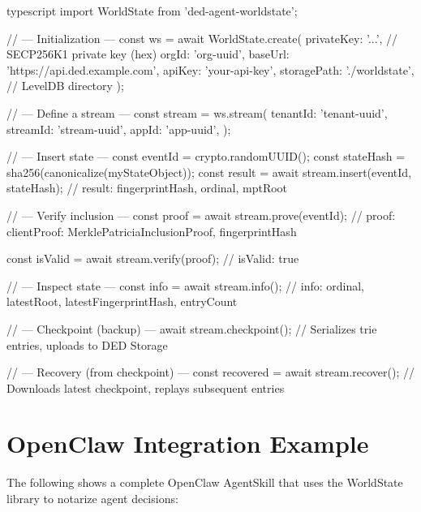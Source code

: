 \documentclass[11pt,a4paper]{article}
\begin{document}
\begin{codebox}{typescript}
import { WorldState } from 'ded-agent-worldstate';

// --- Initialization ---
const ws = await WorldState.create({
  privateKey: '...',           // SECP256K1 private key (hex)
  orgId: 'org-uuid',
  baseUrl: 'https://api.ded.example.com',
  apiKey: 'your-api-key',
  storagePath: './worldstate', // LevelDB directory
});

// --- Define a stream ---
const stream = ws.stream({
  tenantId: 'tenant-uuid',
  streamId: 'stream-uuid',
  appId: 'app-uuid',
});

// --- Insert state ---
const eventId = crypto.randomUUID();
const stateHash = sha256(canonicalize(myStateObject));
const result = await stream.insert(eventId, stateHash);
// result: { fingerprintHash, ordinal, mptRoot }

// --- Verify inclusion ---
const proof = await stream.prove(eventId);
// proof: { clientProof: MerklePatriciaInclusionProof, fingerprintHash }

const isValid = await stream.verify(proof);
// isValid: true

// --- Inspect state ---
const info = await stream.info();
// info: { ordinal, latestRoot, latestFingerprintHash, entryCount }

// --- Checkpoint (backup) ---
await stream.checkpoint();
// Serializes trie entries, uploads to DED Storage

// --- Recovery (from checkpoint) ---
const recovered = await stream.recover();
// Downloads latest checkpoint, replays subsequent entries
\end{codebox}


\section{OpenClaw Integration Example}

The following shows a complete OpenClaw AgentSkill that uses the WorldState library to
notarize agent decisions:
\end{document}
